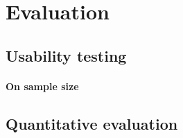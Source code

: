 \chapter{Evaluation}\label{chap:evaluation}

\section{Usability testing}\label{sec:usability-testing}

\cite{rubin2008handbook, dumas1999practical}

\subsubsection*{On sample size}
\cite{faulkner2003beyond}

\section{Quantitative evaluation}\label{sec:quantitative-evaluation}



